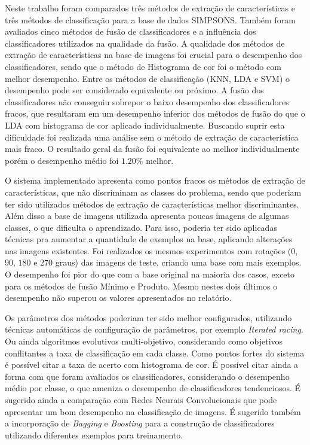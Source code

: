 \documentclass[journal]{IEEEtran}
\begin{document}
Neste trabalho foram comparados três métodos de extração de características e três métodos de classificação para a base de dados SIMPSONS.
Também foram avaliados cinco métodos de fusão de classificadores e a influência dos classificadores utilizados na qualidade da fusão.
A qualidade dos métodos de extração de características na base de imagens foi crucial para o desempenho dos classificadores, sendo que o método de Histograma de cor foi o método com melhor desempenho.
Entre os métodos de classificação (KNN, LDA e SVM) o desempenho pode ser considerado equivalente ou próximo.
A fusão dos classificadores não conseguiu sobrepor o baixo desempenho dos classificadores fracos, que resultaram em um desempenho inferior dos métodos de fusão do que o LDA com histograma de cor aplicado individualmente.
Buscando suprir esta dificuldade foi realizada uma análise sem o método de extração de característica mais fraco.
O resultado geral da fusão foi equivalente ao melhor individualmente porém o desempenho médio foi $1.20\%$ melhor.

O sistema implementado apresenta como pontos fracos os métodos de extração de características, que não discriminam as classes do problema, sendo que poderiam ter sido utilizados métodos de extração de características melhor discriminantes.
Além disso a base de imagens utilizada apresenta poucas imagens de algumas classes, o que dificulta o aprendizado.
Para isso, poderia ter sido aplicadas técnicas pra aumentar a quantidade de exemplos na base, aplicando alterações nas imagens existentes. 
Foi realizados os mesmos experimentos com rotações ($0$, $90$, $180$ e $270$ graus) das imagens de teste, criando uma base com mais exemplos. O desempenho foi pior do que com a base original na maioria dos casos, exceto para os métodos de fusão Mínimo e Produto. Mesmo nestes dois últimos o desempenho não superou os valores apresentados no relatório.

Os parâmetros dos métodos poderiam ter sido melhor configurados, utilizando técnicas automáticas de configuração de parâmetros, por exemplo {\it Iterated racing}. Ou ainda algoritmos evolutivos multi-objetivo, considerando como objetivos conflitantes a taxa de classificação em cada classe.
Como pontos fortes do sistema é possível citar a taxa de acerto com histograma de cor.
É possível citar ainda a forma com que foram avaliados os classificadores, considerando o desempenho médio por classe, o que ameniza o desempenho de classificadores tendenciosos.
É sugerido ainda a comparação com Redes Neurais Convolucionais que pode apresentar um bom desempenho na classificação de imagens.
É sugerido também a incorporação de {\it Bagging } e {\it Boosting} para a construção de classificadores utilizando diferentes exemplos para treinamento. 
\end{document}
